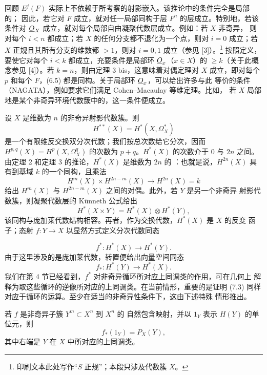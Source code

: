 回顾 $E^{j}(F)$ 实际上不依赖于所考察的射影嵌入。该推论中的条件完全是局部的；
因此，若它对 $F$ 成立，就对任一局部同构于层 $F^{n}$ 的层成立。特别地，若该
条件对 $\underline{O}_X$ 成立，就对每个局部自由凝聚代数层成立。例如：若 $X$ 非奇异，
则对每个 $i<n$ 都成立；若 $X$ 的任何分支都不退化为一个点，则对 $i=0$
成立；若 $X$ 正规且其所有分支的维数都 $>1$，则对 $i=0,1$ 成立（参见
[3]）。\footnote{印刷文本此处写作“$S$ 正规”；本段只涉及代数簇 $X$。}
按照定义，要使它对每个 $i<k$ 都成立，充要条件是局部环
$\underline{O}_x$（$x\in X$）的 $\geq k$（关于此概念参见
[4]）。若 $k=n$，则由定理 3 bis，这意味着对偶定理对 $X$ 成立，即对每个
$p$ 和每个 $F$，(6.5) 都是同构。关于局部环 $\underline{O}_x$，可以给出许多与此
等价的条件（NAGATA），例如要求它们满足 Cohen--Macaulay 等维定理。比如，
若 $X$ 局部地是某个非奇异环境代数簇中的，这一条件便成立。


设 $X$ 是维数为 $n$ 的非奇异射影代数簇。则
\[
  H^{**}(X)=H^{*}(X,\Omega_X^{*})
\]
是一个有限维反交换双分次代数；我们按总次数给它分次，因而
$H^{p,q}(X)=H^{p}(X,\Omega_X^{q})$ 的次数为 $p+q$。$H^{*}(X)$ 的次数介于
$0$ 与 $2n$ 之间。由定理 2 和定理 3 的推论，$H^{*}(X)$ 是维数为 $2n$ 的
：也就是说，$H^{2n}(X)$ 具有到基域 $k$ 的一个同构，且乘法
\[
  H^{m}(X)\times H^{2n-m}(X)\longrightarrow H^{2n}(X)=k
\]
给出 $H^{m}(X)$ 与 $H^{2n-m}(X)$ 之间的对偶。此外，若 $Y$ 是另一个非奇异
射影代数簇，则凝聚代数层的 Künneth 公式给出
\begin{equation}\tag{7.1}
  H^{*}(X\times Y)=H^{*}(X)\otimes H^{*}(Y),
\end{equation}
该同构与庞加莱代数结构相容。再者，作为交换代数，$H^{*}(X)$ 是 $X$ 的反变
函子；态射 $f:Y\longrightarrow X$ 以显然方式定义分次代数同态

\begin{equation}\tag{7.2}
  f^{*}:H^{*}(X)\longrightarrow H^{*}(Y).
\end{equation}
由于这里涉及的是庞加莱代数，转置便给出向量空间同态
\begin{equation}\tag{7.3}
  f_{*}:H^{*}(Y)\longrightarrow H^{*}(X).
\end{equation}
我们在第 4 节已经看到，$f^{*}$ 对非奇异循环所对应上同调类的作用，可在几何上
解释为取这些循环的逆像所对应的上同调类。在当前情形，重要的是证明 (7.3)
同样对应于循环的运算。至少在适当的非奇异性条件下，这由下述特殊
情形推出。

 若 $f$ 是非奇异子簇 $Y^{m}\subset X^{n}$ 到 $X^{n}$ 的
自然包含映射，并以 $1_Y$ 表示 $H(Y)$ 的单位元，则
\begin{equation}\tag{7.4}
  f_{*}(1_Y)=P_X(Y),
\end{equation}
其中右端是 $Y$ 在 $X$ 中所对应的上同调类。

